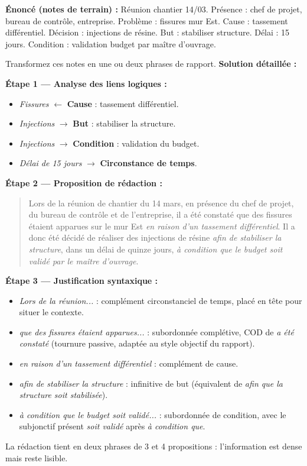 \documentclass[11pt]{article}
\begin{document}
\begin{exoresolu}
\textbf{Énoncé (notes de terrain) :}
\og{}Réunion chantier 14/03. Présence : chef de projet, bureau de contrôle, entreprise. Problème : fissures mur Est. Cause : tassement différentiel. Décision : injections de résine. But : stabiliser structure. Délai : 15 jours. Condition : validation budget par maître d'ouvrage.\fg{}

Transformez ces notes en une ou deux phrases de rapport.
\tcblower
\textbf{Solution détaillée :}

\textbf{Étape 1 — Analyse des liens logiques :}
\begin{itemize}
    \item \textit{Fissures} $\leftarrow$ \textbf{Cause} : tassement différentiel.
    \item \textit{Injections} $\rightarrow$ \textbf{But} : stabiliser la structure.
    \item \textit{Injections} $\rightarrow$ \textbf{Condition} : validation du budget.
    \item \textit{Délai de 15 jours} $\rightarrow$ \textbf{Circonstance de temps}.
\end{itemize}

\textbf{Étape 2 — Proposition de rédaction :}
\begin{quote}
\og{}Lors de la réunion de chantier du 14 mars, en présence du chef de projet, du bureau de contrôle et de l'entreprise, il a été constaté que des fissures étaient apparues sur le mur Est \textit{en raison d'un tassement différentiel}. Il a donc été décidé de réaliser des injections de résine \textit{afin de stabiliser la structure}, dans un délai de quinze jours, \textit{à condition que le budget soit validé par le maître d'ouvrage}.\fg{}
\end{quote}

\textbf{Étape 3 — Justification syntaxique :}
\begin{itemize}
    \item \textit{Lors de la réunion...} : complément circonstanciel de temps, placé en tête pour situer le contexte.
    \item \textit{que des fissures étaient apparues...} : subordonnée complétive, COD de \textit{a été constaté} (tournure passive, adaptée au style objectif du rapport).
    \item \textit{en raison d'un tassement différentiel} : complément de cause.
    \item \textit{afin de stabiliser la structure} : infinitive de but (équivalent de \textit{afin que la structure soit stabilisée}).
    \item \textit{à condition que le budget soit validé...} : subordonnée de condition, avec le subjonctif présent \textit{soit validé} après \textit{à condition que}.
\end{itemize}
La rédaction tient en deux phrases de 3 et 4 propositions : l'information est dense mais reste lisible.
\end{exoresolu}
\end{document}
